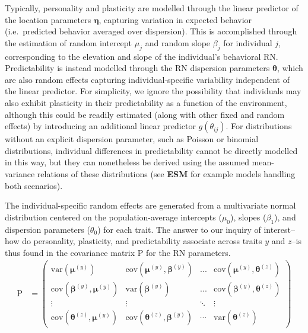 \documentclass{article}
\begin{document}
Typically, personality and plasticity are modelled through the linear
predictor of the location parameters \(\boldsymbol{\eta}\), capturing
variation in expected behavior (i.e.~predicted behavior averaged over
dispersion). This is accomplished through the estimation of random
intercept \(\mu_j\) and random slope \(\beta_j\) for individual \(j\),
corresponding to the elevation and slope of the individual's behavioral
RN. Predictability is instead modelled through the RN dispersion
parameters \(\boldsymbol{\theta}\), which are also random effects
capturing individual-specific variability independent of the linear
predictor. For simplicity, we ignore the possibility that individuals
may also exhibit plasticity in their predictability as a function of the
environment, although this could be readily estimated (along with other
fixed and random effects) by introducing an additional linear predictor
\(g(\theta_{ij})\). For distributions without an explicit dispersion
parameter, such as Poisson or binomial distributions, individual
differences in predictability cannot be directly modelled in this way,
but they can nonetheless be derived using the assumed mean-variance
relations of these distributions (see \textbf{ESM} for example models
handling both scenarios).

The individual-specific random effects are generated from a multivariate
normal distribution centered on the population-average intercepts
(\(\mu_0\)), slopes (\(\beta_1\)), and dispersion parameters
(\(\theta_0\)) for each trait. The answer to our inquiry of
interest--how do personality, plasticity, and predictability associate
across traits \(y\) and \(z\)--is thus found in the covariance matrix
\(\boldsymbol{\mathrm{P}}\) for the RN parameters.
\begin{align} \tag{1.2}\label{eq:1.2}
\boldsymbol{\mathrm{P}} & =
\begin{pmatrix}
\mathrm{var} ( \boldsymbol{\mu}^{(y)} ) & 
\mathrm{cov} (\boldsymbol{\mu}^{(y)}, \boldsymbol{\beta}^{(y)} ) &
...  & \mathrm{cov} (\boldsymbol{\mu}^{(y)}, \boldsymbol{\theta}^{(z)} ) \\
\mathrm{cov} ( \boldsymbol{\beta}^{(y)}, \boldsymbol{\mu}^{(y)} ) & \mathrm{var} ( \boldsymbol{\beta}^{(y)} ) &
... & \mathrm{cov} (\boldsymbol{\beta}^{(y)}, \boldsymbol{\theta}^{(z)} ) \\
\vdots & \vdots & \ddots & \vdots \\
\mathrm{cov} (\boldsymbol{\theta}^{(z)}, \boldsymbol{\mu}^{(y)} ) &
\mathrm{cov} (\boldsymbol{\theta}^{(z)}, \boldsymbol{\beta}^{(y)} ) &
\cdots &  \mathrm{var} ( \boldsymbol{\theta}^{(z)} )
\end{pmatrix}
\end{align}
\end{document}
